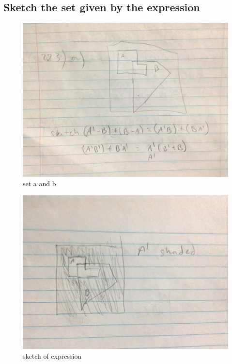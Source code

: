 \documentclass{article}
\begin{document}
	\subsection{Sketch the set given by the expression}
	\begin{figure}[H]
		\includegraphics[width=\linewidth]{2.23/fig1.JPG}
		\caption{set a and b}
	\end{figure}
	\begin{figure}[H]
		\includegraphics[width=\linewidth]{2.23/fig2.JPG}
		\caption{sketch of expression}
	\end{figure}
\end{document}
